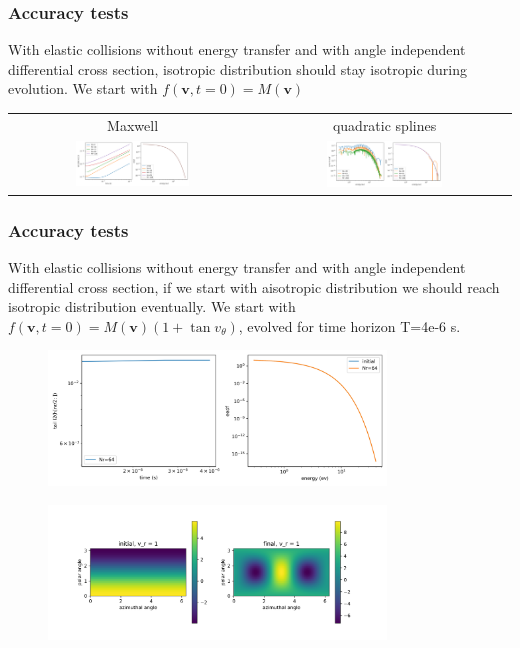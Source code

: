 \documentclass[mathserif, aspectratio=169]{beamer}
\newcommand{\vect}[1]{\boldsymbol{#1}}
\begin{document}
\begin{frame}
	\frametitle{Accuracy tests}
	With elastic collisions without energy transfer and with angle independent differential cross section, isotropic distribution should stay isotropic during evolution. We start with $f(\vect{v},t=0) = M(\vect{v})$
	
	\begin{table}
		\centering
		\begin{tabular}{cc}
			Maxwell &   quadratic splines\\
			\includegraphics[width=0.48\textwidth]{figures/m_no_e_loss_1ev_1e-6.png} & 
			\includegraphics[width=0.48\textwidth]{figures/b_sp2_no_e_loss_1ev_1e-6.png} 
		\end{tabular}
	\end{table}
\end{frame}

\begin{frame}
	\frametitle{Accuracy tests}
	With elastic collisions without energy transfer and with angle independent differential cross section, if we start with aisotropic distribution we should reach isotropic distribution eventually. We start with $f(\vect{v},t=0) = M(\vect{v}) (1 + \tan v_\theta)$, evolved for time horizon T=4e-6 s.
	
	\only<+>
	{
		\begin{figure}
			\includegraphics[width=0.8\textwidth]{figures/m_no_e_loss_aiso_test_1ev_4e-6.png}
		\end{figure}
	}
	\only<+>
	{
		\begin{figure}
			\includegraphics[width=0.8\textwidth]{figures/m_no_e_loss_aiso_test_1ev_4e-6_const_r.png}
		\end{figure}
	}
\end{frame}
\end{document}
